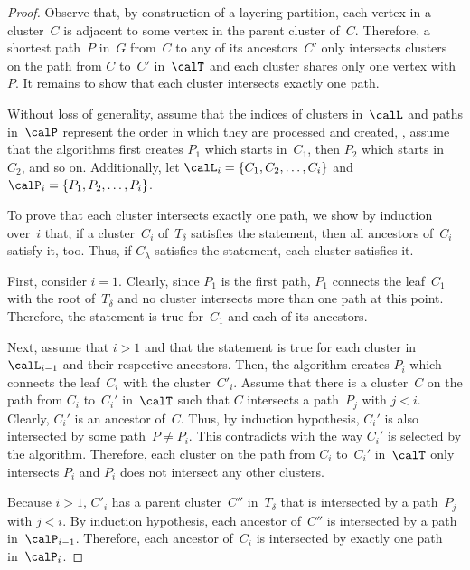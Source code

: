 \begin{proof}
Observe that, by construction of a layering partition, each vertex in a cluster~$C$ is adjacent to some vertex in the parent cluster of~$C$.
Therefore, a shortest path~$P$ in~$G$ from~$C$ to any of its ancestors~$C'$ only intersects clusters on the path from $C$ to~$C'$ in~$\calT$ and each cluster shares only one vertex with~$P$.
It remains to show that each cluster intersects exactly one path.

Without loss of generality, assume that the indices of clusters in~$\calL$ and paths in~$\calP$ represent the order in which they are processed and created, \ie, assume that the algorithms first creates $P_1$ which starts in~$C_1$, then $P_2$ which starts in~$C_2$, and so on.
Additionally, let $\calL_i = \{ C_1, C_2, \ldots, C_i \}$ and $\calP_i = \{ P_1, P_2, \ldots, P_i \}$.

To prove that each cluster intersects exactly one path, we show by induction over~$i$ that, if a cluster~$C_i$ of~$T_\delta$ satisfies the statement, then all ancestors of~$C_i$ satisfy it, too.
Thus, if $C_\lambda$ satisfies the statement, each cluster satisfies it.

First, consider $i = 1$.
Clearly, since $P_1$ is the first path, $P_1$ connects the leaf~$C_1$ with the root of~$T_\delta$ and no cluster intersects more than one path at this point.
Therefore, the statement is true for~$C_1$ and each of its ancestors.

Next, assume that $i > 1$ and that the statement is true for each cluster in~$\calL_{i - 1}$ and their respective ancestors.
Then, the algorithm creates $P_i$ which connects the leaf~$C_i$ with the cluster~$C'_i$.
Assume that there is a cluster~$C$ on the path from $C_i$ to~$C_i'$ in~$\calT$ such that $C$ intersects a path~$P_j$ with $j < i$.
Clearly, $C_i'$ is an ancestor of~$C$.
Thus, by induction hypothesis, $C_i'$ is also intersected by some path~$P \neq P_i$.
This contradicts with the way $C_i'$ is selected by the algorithm.
Therefore, each cluster on the path from $C_i$ to~$C_i'$ in~$\calT$ only intersects $P_i$ and $P_i$ does not intersect any other clusters.

Because $i > 1$, $C'_i$ has a parent cluster~$C''$ in~$T_\delta$ that is intersected by a path~$P_j$ with $j < i$.
By induction hypothesis, each ancestor of~$C''$ is intersected by a path in~$\calP_{i - 1}$.
Therefore, each ancestor of~$C_i$ is intersected by exactly one path in~$\calP_i$.
\end{proof}


